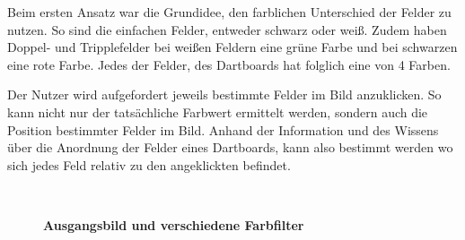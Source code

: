 Beim ersten Ansatz war die Grundidee, den farblichen Unterschied der Felder zu nutzen. So sind die einfachen Felder, entweder schwarz oder weiß. Zudem haben Doppel- und Tripplefelder bei weißen Feldern eine grüne Farbe und bei schwarzen eine rote Farbe. 
Jedes der Felder, des Dartboards hat folglich eine von 4 Farben. 

Der Nutzer wird aufgefordert jeweils bestimmte Felder im Bild anzuklicken. So kann nicht nur der tatsächliche Farbwert ermittelt werden, sondern auch die Position bestimmter Felder im Bild. Anhand der Information und des Wissens über die Anordnung der Felder eines Dartboards, kann also bestimmt werden wo sich jedes Feld relativ zu den angeklickten befindet. 
\begin{figure}[ht]
\qquad
{}\\
\qquad
{}
\caption{\textbf{Ausgangsbild und verschiedene Farbfilter}}
\label{Fig:dartblobs}
\end{figure}
